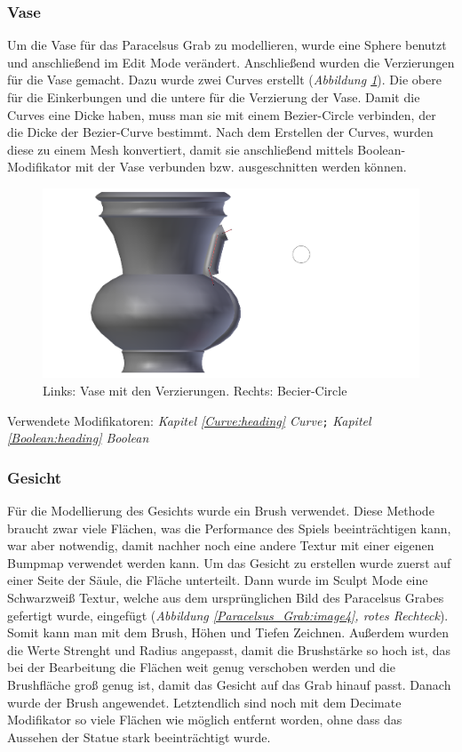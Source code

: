 \subsubsection{Vase}
Um die Vase für das Paracelsus Grab zu modellieren, wurde eine Sphere benutzt und anschließend im Edit Mode verändert. Anschließend wurden die Verzierungen für die Vase gemacht.
Dazu wurde zwei Curves erstellt (\textit{Abbildung \ref{Paracelsus_Grab:image5}}). Die obere für die Einkerbungen und die untere für die Verzierung der Vase. Damit die Curves eine
Dicke haben, muss man sie mit einem Bezier-Circle verbinden, der die Dicke der Bezier-Curve bestimmt.
Nach dem Erstellen der Curves, wurden diese zu einem Mesh konvertiert, damit sie anschließend mittels Boolean-Modifikator mit der Vase verbunden
bzw. ausgeschnitten werden können.

\begin{figure}[H]
    \centering
    \includegraphics[width=.8\textwidth]{images/Paracelsus-Grab_Vase-Curve.png}
    \caption{Links: Vase mit den Verzierungen. Rechts: Becier-Circle}
    \label{Paracelsus_Grab:image5}
\end{figure}

Verwendete Modifikatoren: \textit{Kapitel \ref{Curve:heading} \dq Curve\dq}\verb+;+ \textit{Kapitel \ref{Boolean:heading} \dq Boolean\dq}

\subsubsection{Gesicht}
Für die Modellierung des Gesichts wurde ein Brush verwendet. Diese Methode braucht zwar viele Flächen, was die Performance des Spiels beeinträchtigen kann, war
aber notwendig, damit nachher noch eine andere Textur mit einer eigenen Bumpmap verwendet werden kann. Um das Gesicht zu erstellen wurde zuerst auf einer Seite der Säule,
die Fläche unterteilt. Dann wurde im Sculpt Mode eine Schwarzweiß Textur, welche aus dem ursprünglichen Bild des Paracelsus Grabes gefertigt wurde,
eingefügt (\textit{Abbildung \ref{Paracelsus_Grab:image4}, rotes Rechteck}).
Somit kann man mit dem Brush, Höhen und Tiefen Zeichnen. Außerdem wurden die Werte Strenght und Radius angepasst, damit die Brushstärke so hoch ist, das bei der Bearbeitung die Flächen weit genug verschoben werden
und die Brushfläche groß genug ist, damit das Gesicht auf das Grab hinauf passt. Danach wurde der Brush angewendet. Letztendlich sind noch mit dem Decimate Modifikator so viele Flächen wie
möglich entfernt worden, ohne dass das Aussehen der Statue stark beeinträchtigt wurde.

